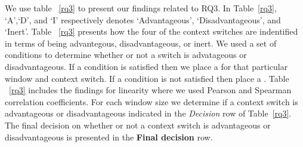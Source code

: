We use table ~\ref{rq3} to present our findings related to RQ3. In Table~\ref{rq3}, `A',`D', and `I' respectively denotes `Advantageous', `Disadvantageous', and `Inert'. Table ~\ref{rq3} presents how the four of the context switches are indentified in terms of being advantegous, disadvantageous, or inert. We used a set of conditions to determine whether or not a switch is advatageous or disadvantageous. If a condition is satisfied then we place a \cmark for that particular window and context switch. If a condition is not satisfied then place a \xmark. Table ~\ref{rq3} includes the findings for linearity where we used Pearson and Spearman correlation coefficients. For each window size we determine if a context switch is advantageous or disadvantageous indicated in the \textit{Decision} row of Table~\ref{rq3}. The final decision on whether or not a context switch is advantageous or disadvantageous is presented in the \textbf{Final decision} row.  
 
